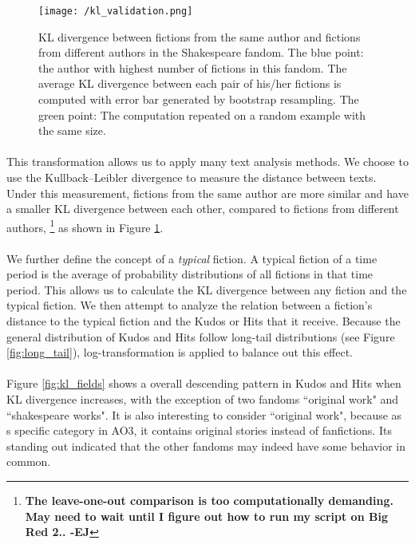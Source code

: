 \documentclass[11pt]{article} %
\def\ej#1{\footnote{\color{blue}\textbf{#1 -EJ}} }
\begin{document}
\begin{figure}[htbp]
\begin{center}
\texttt{[image: /kl\_validation.png]}
\caption{KL divergence between fictions from the same author and fictions from different authors in the Shakespeare fandom. The blue point: the author with highest number of fictions in this fandom. The average KL divergence between each pair of his/her fictions is computed with error bar generated by bootstrap resampling. The green point: The computation repeated on a random example with the same size.}
\label{fig:kl_validation}
\end{center}
\end{figure}

\paragraph{} This transformation allows us to apply many text analysis methods. We choose to use the Kullback--Leibler divergence to measure the distance between texts. Under this measurement, fictions from the same author are more similar and have a smaller KL divergence between each other, compared to fictions from different authors, \ej{The leave-one-out comparison is too computationally demanding. May need to wait until I figure out how to run my script on Big Red 2..} as shown in Figure \ref{fig:kl_validation}.

\paragraph{} We further define the concept of a \emph{typical} fiction. A typical fiction of a time period is the average of probability distributions of all fictions in that time period. This allows us to calculate the KL divergence between any fiction and the typical fiction. We then attempt to analyze the relation between a fiction's distance to the typical fiction and the Kudos or Hits that it receive. Because the general distribution of Kudos and Hits follow long-tail distributions (see Figure \ref{fig:long_tail}), log-transformation is applied to balance out this effect. 

\paragraph{} Figure \ref{fig:kl_fields} shows a overall descending pattern in Kudos and Hits when KL divergence increases, with the exception of two fandoms ``original work" and ``shakespeare works". It is also interesting to consider ``original work", because as s specific category in AO3, it contains original stories instead of fanfictions. Its standing out indicated that the other fandoms may indeed have some behavior in common. 
\end{document}
